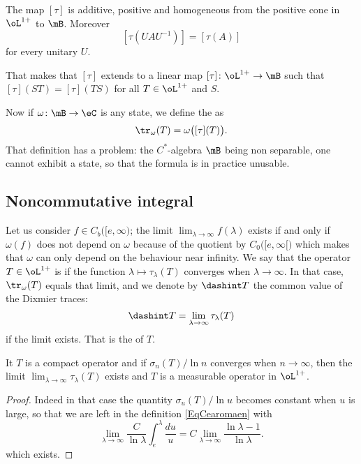 \begin{proposition}
The map $[\tau]$ is additive, positive and homogeneous from the positive cone in $\oL^{1+}$ to $\mB$. Moreover
\[
  [\tau(UAU^{-1})]=[\tau(A)]
\]
for every unitary $U$.
\end{proposition}
That makes that $[\tau]$ extends to a linear map $[\tau]\colon \oL^{1+}\to \mB$ such that $[\tau](ST)=[\tau](TS)$ for all $T\in\oL^{1+}$ and $S$.

Now if $\omega\colon \mB\to \eC$ is any state, we define the  as
\begin{equation}
\tr_{\omega}(T)=\omega\big( [\tau](T) \big).
\end{equation}
That definition has a problem: the $C^*$-algebra $\mB$ being non separable, one cannot exhibit a state, so that the formula is in practice unusable.

\subsection{Noncommutative integral}

Let us consider $f\in C_b\big( [e,\infty \big)$; the limit $\lim_{\lambda\to\infty}f(\lambda)$ exists if and only if $\omega(f)$ does not depend on $\omega$ because of the quotient by $C_0\big( [e,\infty[ \big)$ which makes that $\omega$ can only depend on the behaviour near infinity. We say that the operator $T\in\oL^{1+}$ is  if the function $\lambda\mapsto\tau_{\lambda}(T)$ converges when $\lambda\to\infty$. In that case, $\tr_{\omega}(T)$ equals that limit, and we denote by $\dashint T$ the common value of the Dixmier traces:
\begin{equation}
\dashint T=\lim_{\lambda\to\infty}\tau_{\lambda}(T)
\end{equation}
if the limit exists. That is the  of $T$.

\begin{proposition}
    It $T$ is a compact operator and if $\sigma_n(T)/\ln n$ converges when $n\to\infty$, then the limit $\lim_{\lambda\to\infty}\tau_{\lambda}(T)$ exists and $T$ is a measurable operator in $\oL^{1+}$. 
\end{proposition}

\begin{proof}
    Indeed in that case the quantity $\sigma_u(T)/\ln u$ becomes constant when $u$ is large, so that we are left in the definition \eqref{EqCearomaen} with
\[
  \lim_{\lambda\to\infty}\frac{C}{ \ln\lambda }\int_e^{\lambda}\frac{ du }{ u }=C\lim_{\lambda\to\infty}\frac{ \ln\lambda-1 }{ \ln\lambda }.
\]
which exists.
\end{proof}

